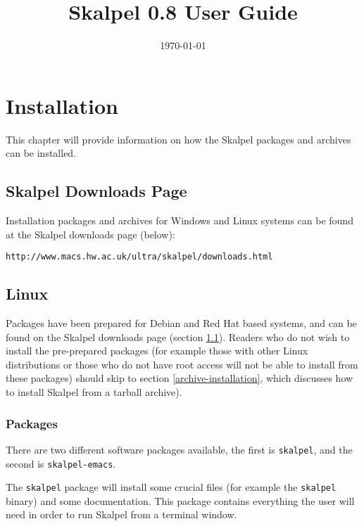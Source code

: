 \documentclass{report}
\title{Skalpel 0.8 User Guide}
\date{\today}
\begin{document}
\maketitle
\vspace{110mm}

\newpage

\tableofcontents

\newpage

\chapter {Installation}
\label{skalpel-installation}

This chapter will provide information on how the Skalpel packages and
archives can be installed.

\section {Skalpel Downloads Page}
\label{skalpel-downloads-page}

Installation packages and archives for Windows and Linux systems can
be found at the Skalpel downloads page (below):

\begin{center}\texttt{http://www.macs.hw.ac.uk/ultra/skalpel/downloads.html}\end{center}

\section {Linux}

Packages have been prepared for Debian and Red Hat based systems, and
can be found on the Skalpel downloads page (section
\ref{skalpel-downloads-page}). Readers who do not wish to install the
pre-prepared packages (for example those with other Linux
distributions or those who do not have root access will not be able to
install from these packages) should skip to section
\ref{archive-installation}, which discusses how to install Skalpel
from a tarball archive).

\subsection {Packages}

There are two different software packages available, the first is
\texttt{skalpel}, and the second is \texttt{skalpel-emacs}.

The \texttt{skalpel} package will install some crucial files (for
example the \texttt{skalpel} binary) and some documentation. This
package contains everything the user will need in order to run Skalpel
from a terminal window.
\end{document}
